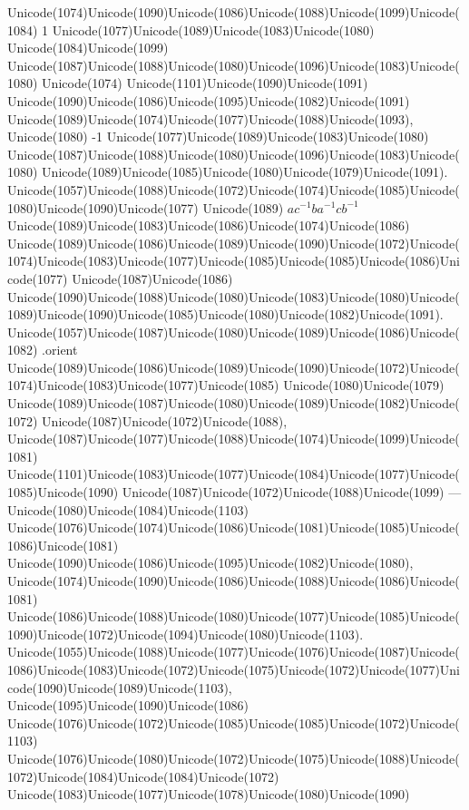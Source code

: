 \documentclass[a4paper,11pt]{report}
\begin{document}
{{Unicode(1074)Unicode(1090)Unicode(1086)Unicode(1088)Unicode(1099)Unicode(1084)
1 Unicode(1077)Unicode(1089)Unicode(1083)Unicode(1080)
Unicode(1084)Unicode(1099)
Unicode(1087)Unicode(1088)Unicode(1080)Unicode(1096)Unicode(1083)Unicode(1080)
Unicode(1074) Unicode(1101)Unicode(1090)Unicode(1091)
Unicode(1090)Unicode(1086)Unicode(1095)Unicode(1082)Unicode(1091)
Unicode(1089)Unicode(1074)Unicode(1077)Unicode(1088)Unicode(1093),
Unicode(1080) -1 Unicode(1077)Unicode(1089)Unicode(1083)Unicode(1080)
Unicode(1087)Unicode(1088)Unicode(1080)Unicode(1096)Unicode(1083)Unicode(1080)
Unicode(1089)Unicode(1085)Unicode(1080)Unicode(1079)Unicode(1091).
Unicode(1057)Unicode(1088)Unicode(1072)Unicode(1074)Unicode(1085)Unicode(1080)Unicode(1090)Unicode(1077)
Unicode(1089) $ac^{-1}ba^{-1}cb^{-1}$ Unicode(1089)Unicode(1083)Unicode(1086)Unicode(1074)Unicode(1086)
Unicode(1089)Unicode(1086)Unicode(1089)Unicode(1090)Unicode(1072)Unicode(1074)Unicode(1083)Unicode(1077)Unicode(1085)Unicode(1085)Unicode(1086)Unicode(1077)
Unicode(1087)Unicode(1086)
Unicode(1090)Unicode(1088)Unicode(1080)Unicode(1083)Unicode(1080)Unicode(1089)Unicode(1090)Unicode(1085)Unicode(1080)Unicode(1082)Unicode(1091).  Unicode(1057)Unicode(1087)Unicode(1080)Unicode(1089)Unicode(1086)Unicode(1082)
.orient
Unicode(1089)Unicode(1086)Unicode(1089)Unicode(1090)Unicode(1072)Unicode(1074)Unicode(1083)Unicode(1077)Unicode(1085)
Unicode(1080)Unicode(1079)
Unicode(1089)Unicode(1087)Unicode(1080)Unicode(1089)Unicode(1082)Unicode(1072)
Unicode(1087)Unicode(1072)Unicode(1088),
Unicode(1087)Unicode(1077)Unicode(1088)Unicode(1074)Unicode(1099)Unicode(1081)
Unicode(1101)Unicode(1083)Unicode(1077)Unicode(1084)Unicode(1077)Unicode(1085)Unicode(1090)
Unicode(1087)Unicode(1072)Unicode(1088)Unicode(1099) ---
Unicode(1080)Unicode(1084)Unicode(1103)
Unicode(1076)Unicode(1074)Unicode(1086)Unicode(1081)Unicode(1085)Unicode(1086)Unicode(1081)
Unicode(1090)Unicode(1086)Unicode(1095)Unicode(1082)Unicode(1080),
Unicode(1074)Unicode(1090)Unicode(1086)Unicode(1088)Unicode(1086)Unicode(1081)
Unicode(1086)Unicode(1088)Unicode(1080)Unicode(1077)Unicode(1085)Unicode(1090)Unicode(1072)Unicode(1094)Unicode(1080)Unicode(1103).
Unicode(1055)Unicode(1088)Unicode(1077)Unicode(1076)Unicode(1087)Unicode(1086)Unicode(1083)Unicode(1072)Unicode(1075)Unicode(1072)Unicode(1077)Unicode(1090)Unicode(1089)Unicode(1103),
Unicode(1095)Unicode(1090)Unicode(1086)
Unicode(1076)Unicode(1072)Unicode(1085)Unicode(1085)Unicode(1072)Unicode(1103)
Unicode(1076)Unicode(1080)Unicode(1072)Unicode(1075)Unicode(1088)Unicode(1072)Unicode(1084)Unicode(1084)Unicode(1072)
Unicode(1083)Unicode(1077)Unicode(1078)Unicode(1080)Unicode(1090)
}}
\end{document}
